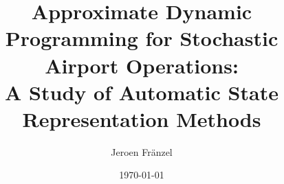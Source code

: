 \documentclass[12pt,a4paper]{report}
\title{Approximate Dynamic Programming for Stochastic Airport Operations: \\
	A Study of Automatic State Representation Methods}
\author{Jeroen Fränzel}
\date{\today}
\theoremstyle{definition}
\theoremstyle{remark}
\begin{document}
	
	\maketitle
	
	\begin{abstract}
		
	\end{abstract}
	
	\tableofcontents
	
	
	
	
	
	
	
	
	
	
	
	
	
	
	\appendix
	
	
	
\end{document}
